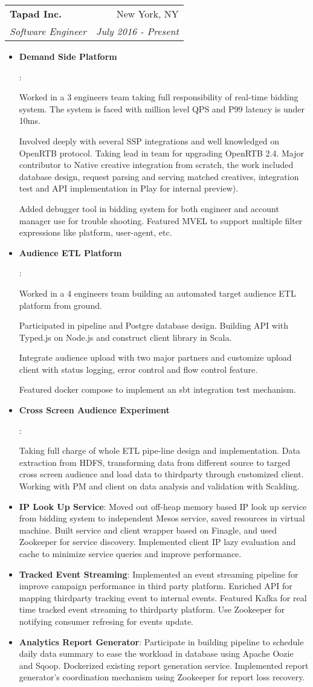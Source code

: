 \documentclass[letterpaper,11pt]{article}
\makeatletter
\newcommand{\resumeItem}[2]{
	\item\small{
		\textbf{#1}{: #2 \vspace{-2pt}}
	}
}
\newcommand{\resumeSubheading}[4]{
	\vspace{-1pt}\item
	\begin{tabular*}{0.97\textwidth}{l@{\extracolsep{\fill}}r}
		\textbf{#1} & #2 \\
		\textit{\small#3} & \textit{\small #4} \\
	\end{tabular*}\vspace{-5pt}
}
\newcommand{\resumeItemListStart}{\begin{itemize}}
\newcommand{\resumeItemListEnd}{\end{itemize}\vspace{-5pt}}
\makeatother
\begin{document}
	\resumeSubheading
	{Tapad Inc.}{New York, NY}
	{Software Engineer}{July 2016 - Present}
	\resumeItemListStart
	\resumeItem{Demand Side Platform}
	{
	
	Worked in a 3 engineers team taking full responsibility of real-time bidding system. The system is faced with million level QPS and P99 latency is under 10ms.
		 	
	Involved deeply with several SSP integrations and well knowledged on OpenRTB protocol. Taking lead in team for upgrading OpenRTB 2.4. Major contributor to Native creative integration from scratch, the work included database design, request parsing and serving matched creatives, integration test and API implementation in Play for internal preview).
	 
	Added debugger tool in bidding system for both engineer and account manager use for trouble shooting. Featured MVEL to support multiple filter expressions like platform, user-agent, etc. }

	\resumeItem{Audience ETL Platform}{
		
	Worked in a 4 engineers team building an automated target audience ETL platform from ground. 
	
	Participated in pipeline and Postgre database design. Building API with Typed.js on Node.js and construct client library in Scala. 
	
	Integrate audience upload with two major partners and customize upload client with status logging, error control and flow control feature. 
	
	Featured docker compose to implement an sbt integration test mechanism.
	}
	
	\resumeItem{Cross Screen Audience Experiment}{
		
	Taking full charge of whole ETL pipe-line design and implementation. Data extraction from HDFS, transforming data from different source to targed cross screen audience and load data to thirdparty through customized client. Working with PM and client on data analysis and validation with Scalding. }

	\resumeItem{IP Look Up Service}{
	Moved out off-heap memory based IP look up service from bidding system to independent Mesos service, saved resources in virtual machine.
	Built service and client wrapper based on Finagle, and used Zookeeper for service discovery.
	Implemented client IP lazy evaluation and cache to minimize service queries and improve performance.
	}
	\resumeItem{Tracked Event Streaming}{
	Implemented an event streaming pipeline for improve campaign performance in third party platform.	
	Enriched API for mapping thirdparty tracking event to internal events.
	Featured Kafka for real time tracked event streaming to thirdparty platform.
	Use Zookeeper for notifying consumer refresing for events update.	
	}
	\resumeItem{Analytics Report Generator}{
	Participate in building pipeline to schedule daily data summary to ease the workload in database using Apache Oozie and Sqoop.	
	Dockerized existing report generation service.
	Implemented report generator's coordination mechanism using Zookeeper for report loss recovery.
	}
	\resumeItemListEnd
	
\end{document}
